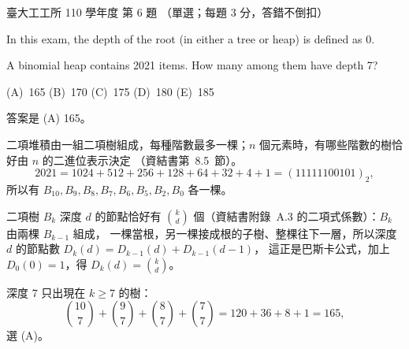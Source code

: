 \begin{pastexam}[label={px:ntu-110-ie-ds-06}]{臺大工工所 110 學年度 第 6 題}
（單選；每題 3 分，答錯不倒扣）

In this exam, the depth of the root (in either a tree or heap) is defined as 0.

A binomial heap contains 2021 items. How many among them have depth 7?

(A)~165 \qquad (B)~170 \qquad (C)~175 \qquad (D)~180 \qquad (E)~185
\end{pastexam}

\begin{pastsoln}
答案是 (A) 165。

二項堆積由一組二項樹組成，每種階數最多一棵；$n$ 個元素時，有哪些階數的樹恰好由 $n$ 的二進位表示決定
（資結書第~8.5~節）。
\[
  2021 = 1024 + 512 + 256 + 128 + 64 + 32 + 4 + 1 = (11111100101)_2 ,
\]
所以有 $B_{10}, B_9, B_8, B_7, B_6, B_5, B_2, B_0$ 各一棵。

二項樹 $B_k$ 深度 $d$ 的節點恰好有 $\binom{k}{d}$ 個（資結書附錄~A.3 的二項式係數）：$B_k$ 由兩棵 $B_{k-1}$ 組成，
一棵當根，另一棵接成根的子樹、整棵往下一層，所以深度 $d$ 的節點數 $D_k(d) = D_{k-1}(d) + D_{k-1}(d-1)$，
這正是巴斯卡公式，加上 $D_0(0) = 1$，得 $D_k(d) = \binom{k}{d}$。

深度 $7$ 只出現在 $k \ge 7$ 的樹：
\[
  \binom{10}{7} + \binom{9}{7} + \binom{8}{7} + \binom{7}{7} = 120 + 36 + 8 + 1 = 165 ,
\]
選 (A)。
\end{pastsoln}
